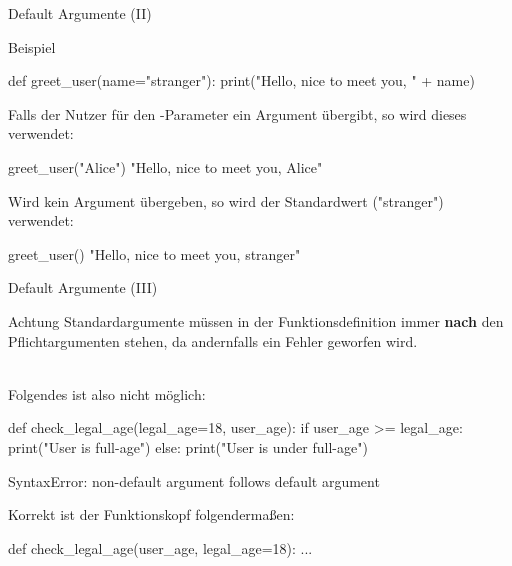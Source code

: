     \begin{frame}[fragile]{Default Argumente (II)}
        \begin{exampleblock}{Beispiel}
\begin{pythoncode}

def greet_user(name="stranger"):
    print("Hello, nice to meet you, " + name)
\end{pythoncode}

Falls der Nutzer für den -Parameter ein Argument übergibt, so wird dieses verwendet:
\begin{pythoncode}
greet_user("Alice")
"Hello, nice to meet you, Alice"
\end{pythoncode}

Wird kein Argument übergeben, so wird der Standardwert ("stranger") verwendet:
\begin{pythoncode}
greet_user()
"Hello, nice to meet you, stranger"
\end{pythoncode}
        \end{exampleblock}
    \end{frame}
    
    \begin{frame}[fragile]{Default Argumente (III)}
        \begin{alertblock}{Achtung}
            Standardargumente müssen in der Funktionsdefinition immer \textbf{nach} den Pflichtargumenten stehen, da andernfalls ein Fehler geworfen wird.\\~\
            
            Folgendes ist also nicht möglich:
\begin{pythoncode}
def check_legal_age(legal_age=18, user_age):
    if user_age >= legal_age:
        print("User is full-age")
    else:
        print("User is under full-age")

SyntaxError: non-default argument follows default argument
\end{pythoncode}

        Korrekt ist der Funktionskopf folgendermaßen:
\begin{pythoncode}
def check_legal_age(user_age, legal_age=18):
    ...
\end{pythoncode}        
        \end{alertblock}
    \end{frame}
    

